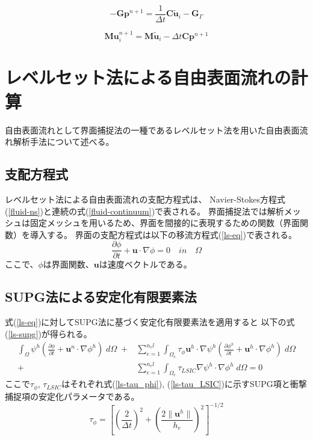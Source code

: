 \documentclass[8pt,a4paper]{article}
\newcommand{\bm}{\boldsymbol}
\begin{document}
\begin{equation}
\label{matrix-poisson}
	-\bm{G} \bm{p}^{n+1} = \frac{1}{\Delta t} \bm{C} \tilde{\bm{u}}_{i} - \bm{G}_{\Gamma}
\end{equation}

\begin{equation}
\label{matrix-correct}
	\bm{M} \bm{u}_{i}^{n+1} = \bm{M} \tilde{\bm{u}}_{i} - \Delta t \bm{C} \bm{p}^{n+1}
\end{equation}

\newpage
\section{レベルセット法による自由表面流れの計算}
自由表面流れとして界面捕捉法の一種であるレベルセット法を用いた自由表面流れ解析手法について述べる。

\subsection{支配方程式}
レベルセット法による自由表面流れの支配方程式は、
Navier-Stokes方程式(\ref{fluid-ns})と連続の式(\ref{fluid-continuum})で表される。
界面捕捉法では解析メッシュは固定メッシュを用いるため、界面を間接的に表現するための関数（界面関数）を導入する。
界面の支配方程式は以下の移流方程式(\ref{ls-eq})で表される。
\begin{equation}
\label{ls-eq}
	\frac{\partial \phi}{\partial t} + \bm{u} \cdot \nabla \phi = 0 \quad in \quad \Omega
\end{equation}
ここで、$\phi$は界面関数、$\bm{u}$は速度ベクトルである。

\subsection{SUPG法による安定化有限要素法}
式(\ref{ls-eq})に対してSUPG法に基づく安定化有限要素法を適用すると
以下の式(\ref{ls-supg})が得られる。
\begin{equation}
\label{ls-supg}
		\begin{split}
		\int_{\Omega} \psi^{h}\left( \frac{\partial \phi}{\partial t} + \bm{u}^{n} \cdot \nabla \phi^{h} \right) \; d\Omega \;+& 
		\sum^{n_el}_{e=1} \int_{\Omega_{e}} \tau_{\phi} \bm{u}^{h} \cdot \nabla \psi^{h} \left( \frac{\partial \phi^{h}}{\partial t} + \bm{u}^{h} \cdot \nabla \phi^{h} \right) \; d\Omega \\
		+& \sum^{n_el}_{e=1} \int_{\Omega_{e}} \tau_{LSIC} \nabla \psi^{h} \cdot \nabla \phi^{h} \; d\Omega = 0
	\end{split}
\end{equation}
ここで$\tau_\phi$, $\tau_{LSIC}$はそれぞれ式(\ref{ls-tau_phi}), (\ref{ls-tau_LSIC})に示すSUPG項と衝撃捕捉項の安定化パラメータである。
\begin{equation}
\label{ls-tau_phi}
	\tau_{\phi} = \left[ \left(\frac{2}{\Delta t} \right)^2 + \left(\frac{2 \| \bm{u}^{h} \|}{h_{e}} \right)^2 \right]^{-1/2}
\end{equation}
\end{document}
